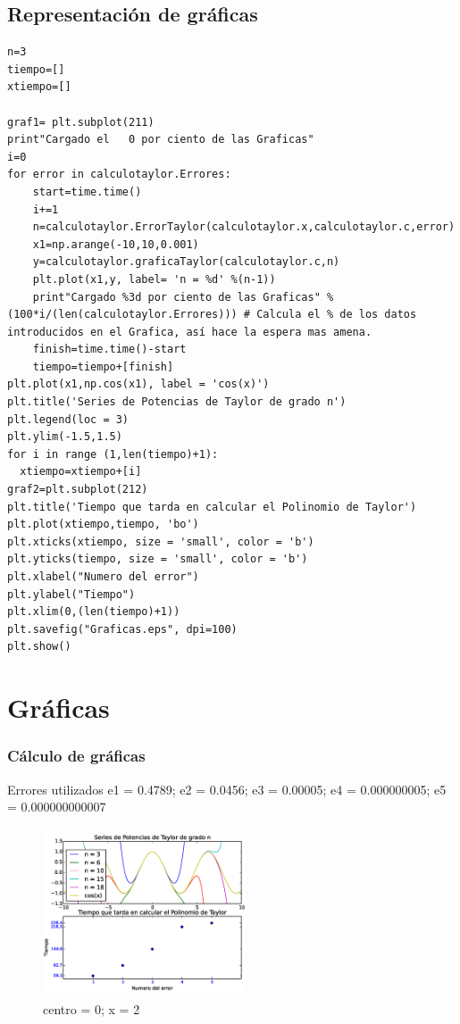 \documentclass{beamer}
\begin{document}
\subsection{Representación de gráficas}
\begin{frame}[fragile]
\begin{center}
\begin{tiny}
\begin{verbatim}
n=3
tiempo=[]
xtiempo=[]

graf1= plt.subplot(211)
print"Cargado el   0 por ciento de las Graficas"
i=0
for error in calculotaylor.Errores:
    start=time.time()
    i+=1
    n=calculotaylor.ErrorTaylor(calculotaylor.x,calculotaylor.c,error)
    x1=np.arange(-10,10,0.001)
    y=calculotaylor.graficaTaylor(calculotaylor.c,n)
    plt.plot(x1,y, label= 'n = %d' %(n-1))
    print"Cargado %3d por ciento de las Graficas" %(100*i/(len(calculotaylor.Errores))) # Calcula el % de los datos introducidos en el Grafica, así hace la espera mas amena.
    finish=time.time()-start
    tiempo=tiempo+[finish]
plt.plot(x1,np.cos(x1), label = 'cos(x)')    
plt.title('Series de Potencias de Taylor de grado n')
plt.legend(loc = 3) 
plt.ylim(-1.5,1.5)
for i in range (1,len(tiempo)+1):
  xtiempo=xtiempo+[i]
graf2=plt.subplot(212)
plt.title('Tiempo que tarda en calcular el Polinomio de Taylor')
plt.plot(xtiempo,tiempo, 'bo')
plt.xticks(xtiempo, size = 'small', color = 'b')
plt.yticks(tiempo, size = 'small', color = 'b')
plt.xlabel("Numero del error")
plt.ylabel("Tiempo")
plt.xlim(0,(len(tiempo)+1))
plt.savefig("Graficas.eps", dpi=100)
plt.show()
\end{verbatim}
\end{tiny}
\end{center}
\end{frame}


\section{Gráficas}
\begin{frame}
\frametitle{Cálculo de gráficas}
Errores utilizados e1 = 0.4789; e2 = 0.0456; e3 = 0.00005; e4 = 0.000000005; e5 = 0.000000000007
\begin{figure}[!th]
\begin{center}\includegraphics[height=5cm, width=6cm]{images/Graficas.eps}
\caption{centro = 0; x = 2}
\label{cos}
\end{center}
\end{figure} 

\end{frame}  
\end{document}
